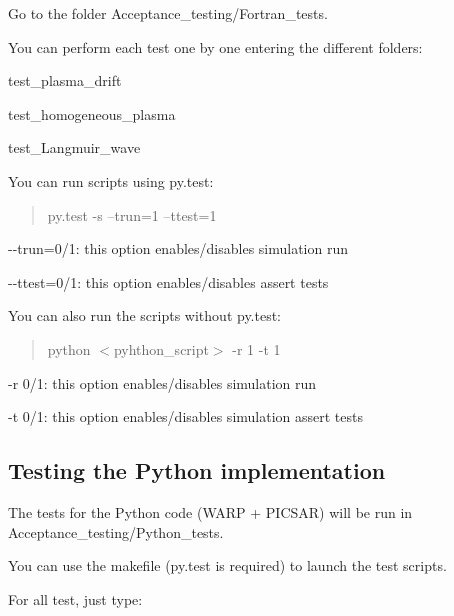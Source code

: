 \begin{DoxyItemize}
\item Go to the folder Acceptance\+\_\+testing/\+Fortran\+\_\+tests.
\item You can perform each test one by one entering the different folders\+:
\begin{DoxyItemize}
\item test\+\_\+plasma\+\_\+drift
\item test\+\_\+homogeneous\+\_\+plasma
\item test\+\_\+\+Langmuir\+\_\+wave
\end{DoxyItemize}
\item You can run scripts using py.\+test\+: \begin{quote}
py.\+test -\/s --trun=1 --ttest=1 \end{quote}

\begin{DoxyItemize}
\item {\ttfamily -\/-\/trun=0/1}\+: this option enables/disables simulation run
\item {\ttfamily -\/-\/ttest=0/1}\+: this option enables/disables assert tests
\end{DoxyItemize}
\item You can also run the scripts without py.\+test\+: \begin{quote}
python $<$pyhthon\+\_\+script$>$ -\/r 1 -\/t 1 \end{quote}

\begin{DoxyItemize}
\item {\ttfamily -\/r 0/1}\+: this option enables/disables simulation run
\item {\ttfamily -\/t 0/1}\+: this option enables/disables simulation assert tests
\end{DoxyItemize}
\end{DoxyItemize}

\subsection*{Testing the Python implementation  }

The tests for the Python code (W\+A\+RP + P\+I\+C\+S\+AR) will be run in {\ttfamily Acceptance\+\_\+testing/\+Python\+\_\+tests}.

You can use the makefile (py.\+test is required) to launch the test scripts.

For all test, just type\+:


